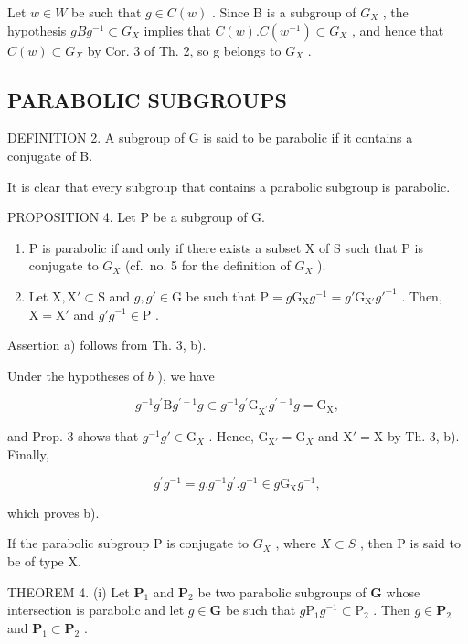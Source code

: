 Let \(w \in W\) be such that \(g \in C(w)\) . Since B is a subgroup of \(G_X\) , the hypothesis \(gBg^{-1} \subset G_X\) implies that \(C(w).C(w^{-1}) \subset G_X\) , and hence that \(C(w) \subset G_X\) by Cor. 3 of Th. 2, so g belongs to \(G_X\) .

\subsection{PARABOLIC SUBGROUPS}

DEFINITION 2. A subgroup of G is said to be parabolic if it contains a conjugate of B.

It is clear that every subgroup that contains a parabolic subgroup is parabolic.

PROPOSITION 4. Let P be a subgroup of G.

\begin{enumerate}
\def\labelenumi{\alph{enumi})}
\item
  P is parabolic if and only if there exists a subset X of S such that P is conjugate to \(G_{X}\) (cf.~no. 5 for the definition of \(G_{X}\) ).
\item
  Let \(\mathrm{X}, \mathrm{X}' \subset \mathrm{S}\) and \(g, g' \in \mathrm{G}\) be such that \(\mathrm{P} = g\mathrm{G}_{\mathrm{X}}g^{-1} = g'\mathrm{G}_{\mathrm{X}'}g'^{-1}\) . Then, \(\mathrm{X} = \mathrm{X}'\) and \(g'g^{-1} \in \mathrm{P}\) .
\end{enumerate}

Assertion a) follows from Th. 3, b).

Under the hypotheses of \(b\) ), we have

\[
g ^ {- 1} g ^ {\prime} \mathrm{B} g ^ {\prime - 1} g \subset g ^ {- 1} g ^ {\prime} \mathrm{G} _ {\mathrm{X} ^ {\prime}} g ^ {\prime - 1} g = \mathrm{G} _ {\mathrm{X}},
\]

and Prop. 3 shows that \(g^{-1}g' \in \mathrm{G}_X\) . Hence, \(\mathrm{G}_{\mathrm{X}'} = \mathrm{G}_X\) and \(\mathrm{X}' = \mathrm{X}\) by Th. 3, b). Finally,

\[
g ^ {\prime} g ^ {- 1} = g. g ^ {- 1} g ^ {\prime}. g ^ {- 1} \in g \mathrm{G} _ {\mathrm{X}} g ^ {- 1},
\]

which proves b).

If the parabolic subgroup P is conjugate to \(G_{X}\) , where \(X \subset S\) , then P is said to be of type X.

THEOREM 4. (i) Let \(\mathbf{P}_1\) and \(\mathbf{P}_2\) be two parabolic subgroups of \(\mathbf{G}\) whose intersection is parabolic and let \(g \in \mathbf{G}\) be such that \(g\mathrm{P}_1g^{-1} \subset \mathrm{P}_2\) . Then \(g \in \mathbf{P}_2\) and \(\mathbf{P}_1 \subset \mathbf{P}_2\) .

